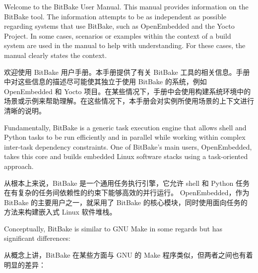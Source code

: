
 Welcome to the BitBake User Manual. This manual provides information on the BitBake tool. The information attempts to be as independent as possible regarding systems that use BitBake, such as OpenEmbedded and the Yocto Project. In some cases, scenarios or examples within the context of a build system are used in the manual to help with understanding. For these cases, the manual clearly states the context.

 欢迎使用 BitBake 用户手册。本手册提供了有关 BitBake 工具的相关信息。手册中对这些信息的描述尽可能使其独立于使用 BitBake 的系统，例如 OpenEmbedded 和 Yocto 项目。在某些情况下，手册中会使用构建系统环境中的场景或示例来帮助理解。在这些情况下，本手册会对实例所使用场景的上下文进行清晰的说明。

 Fundamentally, BitBake is a generic task execution engine that allows shell and Python tasks to be run efficiently and in parallel while working within complex inter-task dependency constraints. One of BitBake's main users, OpenEmbedded, takes this core and builds embedded Linux software stacks using a task-oriented approach.

 从根本上来说，BitBake 是一个通用任务执行引擎，它允许 shell 和 Python 任务在有复杂的任务间依赖性的约束下能够高效的并行运行。 OpenEmbedded，作为 BitBake 的主要用户之一，就采用了 BitBake 的核心模块，同时使用面向任务的方法来构建嵌入式 Linux 软件堆栈。

 Conceptually, BitBake is similar to GNU Make in some regards but has significant differences:

 从概念上讲，BitBake 在某些方面与 GNU 的 Make 程序类似，但两者之间也有着明显的差异：

